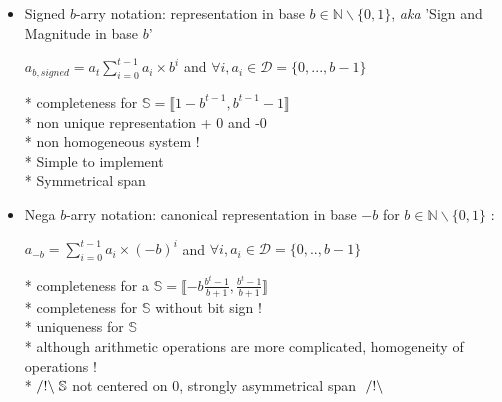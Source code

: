 \begin{itemize}
	\item Signed $b$-arry notation: representation in base $b \in \mathbb{N} \backslash \{0,1\} $, \textit{aka} 'Sign and Magnitude  in base $b$'
		\begin{small}
			\begin{center}	
					$ a_{b,signed} = a_t \sum \limits_{i=0}^{t-1} a_i \times b^i$ and $\forall i, 
					a_i \in \mathcal{D} = \{0, ..., b-1\}$ 		
			\end{center}
		\end{small}	
		* completeness for  $\mathbb{S}=\llbracket 1-b^{t-1}, b^{t-1}-1\rrbracket$ \\
		* non unique representation + 0 and -0\\
		* non homogeneous system ! \\
		* Simple to implement \\  
		* Symmetrical span
			
	\item Nega $b$-arry notation: canonical representation in base $-b$ 
		for $b \in \mathbb{N} \backslash \{0,1\} $ : 
		\begin{small}
			\begin{center}	
					$ a_{-b} = \sum \limits_{i=0}^{t-1} a_i \times (-b)^i$ 
					and $\forall i, a_i \in \mathcal{D}=\{0, .., b-1\}$ 		
			\end{center}
		\end{small}	
		* completeness for a $\mathbb{S} = \llbracket -b \frac{b^t-1}{b+1}, \frac{b^t-1}{b+1}\rrbracket $ \\
		* completeness for $\mathbb{S}$ without bit sign ! \\
		* uniqueness for $\mathbb{S}$ \\
		* although arithmetic operations are more complicated, homogeneity of operations ! \\
		* $/!\backslash \hspace{1mm} \mathbb{S}$ not centered on 0, strongly asymmetrical span $\hspace{1mm} /!\backslash$


\end{itemize}
